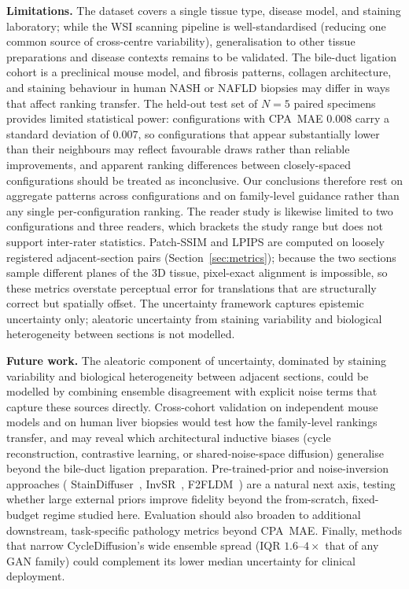 \noindent\textbf{Limitations.}
The dataset covers a single tissue type, disease model, and staining laboratory; while
the WSI scanning pipeline is well-standardised (reducing one common source of
cross-centre variability), generalisation to other tissue preparations and disease
contexts remains to be validated.
The bile-duct ligation cohort is a preclinical mouse model, and fibrosis patterns,
collagen architecture, and staining behaviour in human NASH or NAFLD biopsies may
differ in ways that affect ranking transfer.
The held-out test set of $N{=}5$ paired specimens provides limited statistical power:
configurations with CPA~MAE $0.008$ carry a standard deviation of $0.007$, so
configurations that appear substantially lower than their neighbours may reflect
favourable draws rather than reliable improvements, and apparent ranking differences
between closely-spaced configurations should be treated as inconclusive.
Our conclusions therefore rest on aggregate patterns across configurations and on
family-level guidance rather than any single per-configuration ranking.
The reader study is likewise limited to two configurations and three readers, which
brackets the study range but does not support inter-rater statistics.
Patch-SSIM and LPIPS are computed on loosely registered adjacent-section pairs
(Section~\ref{sec:metrics}); because the two sections sample different planes of the
3D tissue, pixel-exact alignment is impossible, so these metrics overstate perceptual
error for translations that are structurally correct but spatially offset.
The uncertainty framework captures epistemic uncertainty only; aleatoric uncertainty
from staining variability and biological heterogeneity between sections is not modelled.

\noindent\textbf{Future work.}
The aleatoric component of uncertainty, dominated by staining variability and
biological heterogeneity between adjacent sections, could be modelled by combining
ensemble disagreement with explicit noise terms that capture these sources directly.
Cross-cohort validation on independent mouse models and on human liver biopsies would
test how the family-level rankings transfer, and may reveal which architectural
inductive biases (cycle reconstruction, contrastive learning, or shared-noise-space
diffusion) generalise beyond the bile-duct ligation preparation.
Pre-trained-prior and noise-inversion approaches (\eg
StainDiffuser~\cite{staindiffuser2024}, InvSR~\cite{yue2024invsr},
F2FLDM~\cite{ho2024f2fldm}) are a natural next axis, testing whether large external
priors improve fidelity beyond the from-scratch, fixed-budget regime studied here.
Evaluation should also broaden to additional downstream, task-specific pathology metrics
beyond CPA~MAE.
Finally, methods that narrow CycleDiffusion's wide ensemble spread (IQR $1.6$--$4\times$
that of any GAN family) could complement its lower median uncertainty for clinical
deployment.

